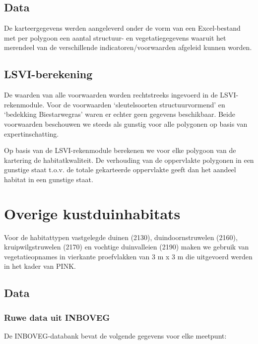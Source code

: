 \documentclass[twoside]{extreport}
\begin{document}
\subsection{Data}\label{data-4}

De karteergegevens werden aangeleverd onder de vorm van een
Excel-bestand met per polygoon een aantal structuur- en
vegetatiegegevens waaruit het merendeel van de verschillende
indicatoren/voorwaarden afgeleid kunnen worden.

\subsection{LSVI-berekening}\label{lsvi-berekening-1}

De waarden van alle voorwaarden worden rechtstreeks ingevoerd in de
LSVI-rekenmodule. Voor de voorwaarden `sleutelsoorten structuurvormend'
en `bedekking Biestarwegras' waren er echter geen gegevens beschikbaar.
Beide voorwaarden beschouwen we steeds als gunstig voor alle polygonen
op basis van expertinschatting.

Op basis van de LSVI-rekenmodule berekenen we voor elke polygoon van de
kartering de habitatkwaliteit. De verhouding van de oppervlakte
polygonen in een gunstige staat t.o.v. de totale gekarteerde oppervlakte
geeft dan het aandeel habitat in een gunstige staat.

\section{Overige kustduinhabitats}\label{overige-kustduinhabitats}

Voor de habitattypen vastgelegde duinen (2130), duindoornstruwelen
(2160), kruipwilgstruwelen (2170) en vochtige duinvalleien (2190) maken
we gebruik van vegetatieopnames in vierkante proefvlakken van 3 m x 3 m
die uitgevoerd werden in het kader van PINK.

\needspace{50mm}

\subsection{Data}\label{data-5}

\subsubsection{Ruwe data uit INBOVEG}\label{ruwe-data-uit-inboveg-2}

De INBOVEG-databank bevat de volgende gegevens voor elke meetpunt:
\end{document}

